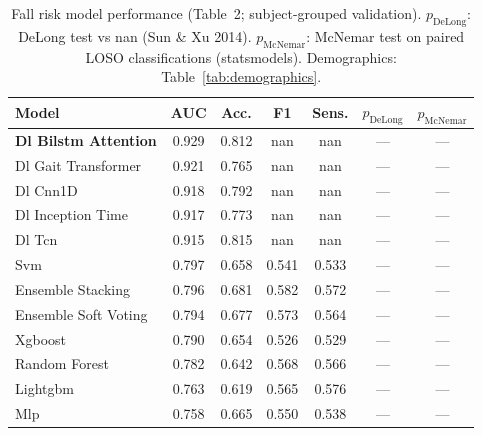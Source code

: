 
\begin{table}[!t]
\renewcommand{\arraystretch}{1.2}
\caption{Fall risk model performance (Table~2; subject-grouped validation). $p_{\mathrm{DeLong}}$: DeLong test vs nan (Sun \& Xu 2014). $p_{\mathrm{McNemar}}$: McNemar test on paired LOSO classifications (statsmodels). Demographics: Table~\ref{tab:demographics}.}
\label{tab:model_performance}
\centering
\begin{tabular}{lcccccc}
\hline\hline
\textbf{Model} & \textbf{AUC} & \textbf{Acc.} & \textbf{F1} & \textbf{Sens.} & \textbf{$p_{\mathrm{DeLong}}$} & \textbf{$p_{\mathrm{McNemar}}$} \\
\hline
\textbf{Dl Bilstm Attention} & 0.929 & 0.812 & nan & nan & — & — \\
Dl Gait Transformer & 0.921 & 0.765 & nan & nan & — & — \\
Dl Cnn1D & 0.918 & 0.792 & nan & nan & — & — \\
Dl Inception Time & 0.917 & 0.773 & nan & nan & — & — \\
Dl Tcn & 0.915 & 0.815 & nan & nan & — & — \\
Svm & 0.797 & 0.658 & 0.541 & 0.533 & — & — \\
Ensemble Stacking & 0.796 & 0.681 & 0.582 & 0.572 & — & — \\
Ensemble Soft Voting & 0.794 & 0.677 & 0.573 & 0.564 & — & — \\
Xgboost & 0.790 & 0.654 & 0.526 & 0.529 & — & — \\
Random Forest & 0.782 & 0.642 & 0.568 & 0.566 & — & — \\
Lightgbm & 0.763 & 0.619 & 0.565 & 0.576 & — & — \\
Mlp & 0.758 & 0.665 & 0.550 & 0.538 & — & — \\
\hline\hline
\end{tabular}
\end{table}
